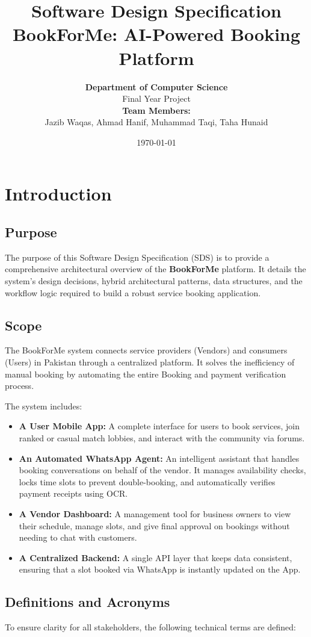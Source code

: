 \documentclass[12pt, a4paper]{article}
\title{\textbf{Software Design Specification}\\BookForMe: AI-Powered  Booking Platform}
\author{
    \textbf{Department of Computer Science}\\
    Final Year Project\\[0.3cm]
    \textbf{Team Members:}\\
    Jazib Waqas, Ahmad Hanif, Muhammad Taqi, Taha Hunaid
}
\date{\today}
\begin{document}
\maketitle
\tableofcontents
\newpage

\section{Introduction}

\subsection{Purpose}
The purpose of this Software Design Specification (SDS) is to provide a comprehensive architectural overview of the \textbf{BookForMe} platform. It details the system's design decisions, hybrid architectural patterns, data structures, and the workflow logic required to build a robust service booking application.

\subsection{Scope}
The BookForMe system connects service providers (Vendors) and consumers (Users) in Pakistan through a centralized platform. It solves the inefficiency of manual booking by automating the entire Booking and payment verification process.

The system includes:
\begin{itemize}
    \item \textbf{A User Mobile App:} A complete interface for users to book services, join ranked or casual match lobbies, and interact with the community via forums.
    \item \textbf{An Automated WhatsApp Agent:} An intelligent assistant that handles booking conversations on behalf of the vendor. It manages availability checks, locks time slots to prevent double-booking, and automatically verifies payment receipts using OCR.
    \item \textbf{A Vendor Dashboard:} A management tool for business owners to view their schedule, manage slots, and give final approval on bookings without needing to chat with customers.
    \item \textbf{A Centralized Backend:} A single API layer that keeps data consistent, ensuring that a slot booked via WhatsApp is instantly updated on the App.
\end{itemize}
\subsection{Definitions and Acronyms}
To ensure clarity for all stakeholders, the following technical terms are defined:
\end{document}
